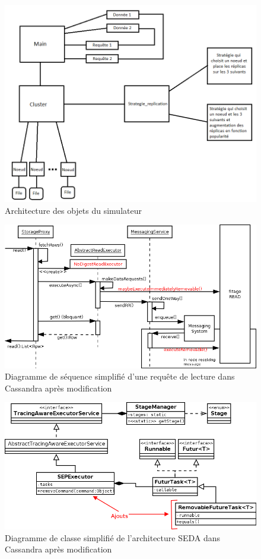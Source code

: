 \documentclass[12pt]{article}
\begin{document}
\begin{figure}[H]
	\centering
        \includegraphics[width=12cm]{images/implementation/archiSimulateur.png}
    \caption{Architecture des objets du simulateur \label{fig:archisimulateur}}
\end{figure}

\begin{figure}[H]
	\centering
        \includegraphics[width=12cm]{images/implementation/read_diagram_modified.png}
    \caption{Diagramme de séquence simplifié d'une requête de lecture dans Cassandra après modification \label{fig:read_diagram_modified}}
\end{figure}

\begin{figure}[p]
	\centering
		\includegraphics[width=15cm]{images/implementation/stages_diagram_modified.png}
	\caption{Diagramme de classe simplifié de l'architecture SEDA dans Cassandra après modification \label{fig:stages_diagram_modified}}
\end{figure}
\end{document}
